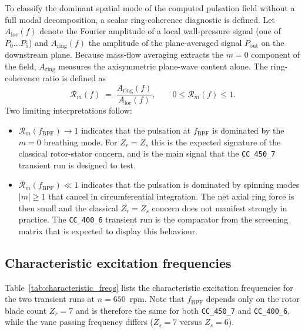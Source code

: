 To classify the dominant spatial mode of the computed pulsation field without a full modal decomposition, a scalar ring-coherence diagnostic is defined. Let $A_{\mathrm{loc}}(f)$ denote the Fourier amplitude of a local wall-pressure signal (one of $P_0 \ldots P_5$) and $A_{\mathrm{ring}}(f)$ the amplitude of the plane-averaged signal $P_{\mathrm{out}}$ on the downstream plane. Because mass-flow averaging extracts the $m=0$ component of the field, $A_{\mathrm{ring}}$ measures the axisymmetric plane-wave content alone. The ring-coherence ratio is defined as
\begin{equation}
    \mathcal{R}_m(f) \;=\;
    \frac{A_{\mathrm{ring}}(f)}{A_{\mathrm{loc}}(f)},
    \qquad 0 \leq \mathcal{R}_m(f) \leq 1. \label{eq:coherence}
\end{equation}
Two limiting interpretations follow:
\begin{itemize}
  \item $\mathcal{R}_m(f_{\mathrm{BPF}}) \to 1$ indicates that the pulsation at $f_{\mathrm{BPF}}$ is dominated by the $m=0$ breathing mode. For $Z_r = Z_s$ this is the expected signature of the classical rotor-stator concern, and is the main signal that the \texttt{CC\_450\_7} transient run is designed to test.
  \item $\mathcal{R}_m(f_{\mathrm{BPF}}) \ll 1$ indicates that the pulsation is dominated by spinning modes $|m|\geq 1$ that cancel in circumferential integration. The net axial ring force is then small and the classical $Z_r = Z_s$ concern does not manifest strongly in practice. The \texttt{CC\_400\_6} transient run is the comparator from the screening matrix that is expected to display this behaviour.
\end{itemize}
 
\subsection{Characteristic excitation frequencies}
\label{sec:spec-peaks}
 
Table~\ref{tab:characteristic_freqs} lists the characteristic excitation frequencies for the two transient runs at $n = 650$~rpm. Note that $f_{\mathrm{BPF}}$ depends only on the rotor blade count $Z_r=7$ and is therefore the same for both \texttt{CC\_450\_7} and \texttt{CC\_400\_6}, while the vane passing frequency differs ($Z_s=7$ versus $Z_s=6$).
 
